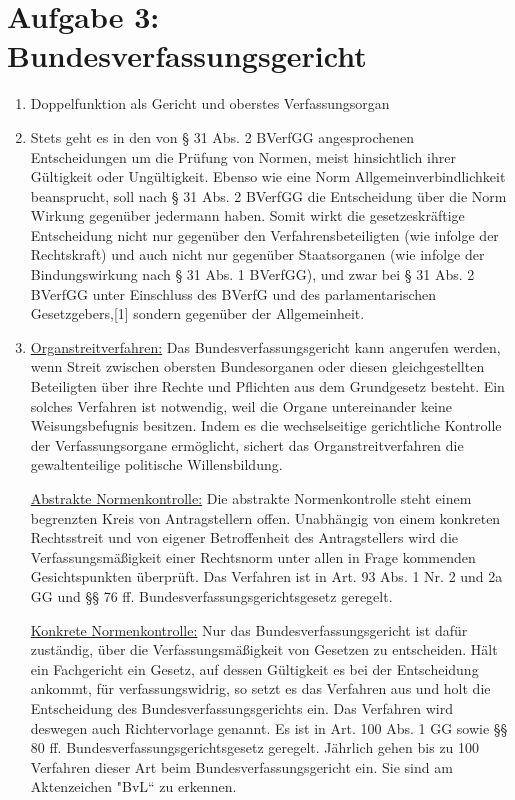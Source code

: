 \documentclass{article}
\begin{document}
	\section*{Aufgabe 3: Bundesverfassungsgericht}
	\begin{enumerate}[label=(\alph*)]
		\item Doppelfunktion als Gericht und oberstes Verfassungsorgan
		\item Stets geht es in den von § 31 Abs. 2 BVerfGG angesprochenen Entscheidungen um die Prüfung von Normen, meist hinsichtlich ihrer Gültigkeit oder Ungültigkeit. Ebenso wie eine Norm Allgemeinverbindlichkeit beansprucht, soll nach § 31 Abs. 2 BVerfGG die Entscheidung über die Norm Wirkung gegenüber jedermann haben. Somit wirkt die gesetzeskräftige Entscheidung nicht nur gegenüber den Verfahrensbeteiligten (wie infolge der Rechtskraft) und auch nicht nur gegenüber Staatsorganen (wie infolge der Bindungswirkung nach § 31 Abs. 1 BVerf­GG), und zwar bei § 31 Abs. 2 BVerfGG unter Einschluss des BVerfG und des parlamentarischen Gesetzgebers,[1] sondern gegenüber der Allgemeinheit.
		\item \underline{Organstreitverfahren:} Das Bundesverfassungsgericht kann angerufen werden, wenn Streit zwischen obersten Bundesorganen oder diesen gleichgestellten Beteiligten über ihre Rechte und Pflichten aus dem Grundgesetz besteht. Ein solches Verfahren ist notwendig, weil die Organe untereinander keine Weisungsbefugnis besitzen. Indem es die wechselseitige gerichtliche Kontrolle der Verfassungsorgane ermöglicht, sichert das Organstreitverfahren die gewaltenteilige politische Willensbildung. 
		
		\underline{Abstrakte Normenkontrolle:} Die abstrakte Normenkontrolle steht einem begrenzten Kreis von Antragstellern offen. Unabhängig von einem konkreten Rechtsstreit und von eigener Betroffenheit des Antragstellers wird die Verfassungsmäßigkeit einer Rechtsnorm unter allen in Frage kommenden Gesichtspunkten überprüft. Das Verfahren ist in Art. 93 Abs. 1 Nr. 2 und 2a GG und §§ 76 ff. Bundesverfassungsgerichtsgesetz geregelt. 
		
		\underline{Konkrete Normenkontrolle:} Nur das Bundesverfassungsgericht ist dafür zuständig, über die Verfassungsmäßigkeit von Gesetzen zu entscheiden. Hält ein Fachgericht ein Gesetz, auf dessen Gültigkeit es bei der Entscheidung ankommt, für verfassungswidrig, so setzt es das Verfahren aus und holt die Entscheidung des Bundesverfassungsgerichts ein. Das Verfahren wird deswegen auch Richtervorlage genannt. Es ist in Art. 100 Abs. 1 GG sowie §§ 80 ff. Bundesverfassungsgerichtsgesetz geregelt. Jährlich gehen bis zu 100 Verfahren dieser Art beim Bundesverfassungsgericht ein. Sie sind am Aktenzeichen "BvL“ zu erkennen. 
		

\end{enumerate}
\end{document}
